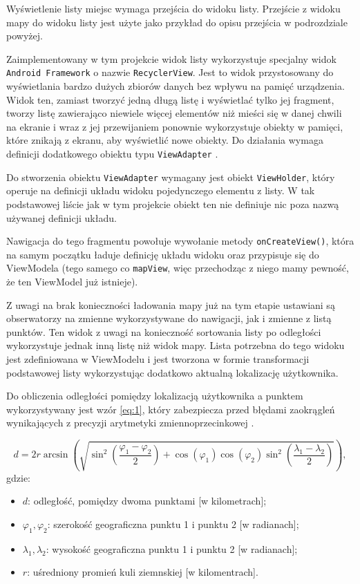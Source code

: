 \documentclass[polish,polish,a4paper,12pt]{article}
\begin{document}
	Wyświetlenie listy miejsc wymaga przejścia do widoku listy. Przejście z widoku mapy do widoku listy jest użyte jako przykład do opisu przejścia w podrozdziale powyżej.

	Zaimplementowany w tym projekcie widok listy wykorzystuje specjalny widok \texttt{Android Framework} o nazwie \texttt{RecyclerView}. Jest to widok przystosowany do wyświetlania bardzo dużych zbiorów danych bez wpływu na pamięć urządzenia. Widok ten, zamiast tworzyć jedną długą listę i wyświetlać tylko jej fragment, tworzy listę zawierająco niewiele więcej elementów niż mieści się w danej chwili na ekranie i wraz z jej przewijaniem ponownie wykorzystuje obiekty w pamięci, które znikają z ekranu, aby wyświetlić nowe obiekty. Do działania wymaga definicji dodatkowego obiektu typu \texttt{ViewAdapter} \cite{androidapi}.

	Do stworzenia obiektu \texttt{ViewAdapter} wymagany jest obiekt \texttt{ViewHolder}, który operuje na definicji układu widoku pojedynczego elementu z listy. W tak podstawowej liście jak w tym projekcie obiekt ten nie definiuje nic poza nazwą używanej definicji układu.

	Nawigacja do tego fragmentu powołuje wywołanie metody \texttt{onCreateView()}, która na samym początku ładuje definicję układu widoku oraz przypisuje się do ViewModela (tego samego co \texttt{mapView}, więc przechodząc z niego mamy pewność, że ten ViewModel już istnieje).

	Z uwagi na brak konieczności ładowania mapy już na tym etapie ustawiani są obserwatorzy na zmienne wykorzystywane do nawigacji, jak i zmienne z listą punktów. Ten widok z uwagi na konieczność sortowania listy po odległości wykorzystuje jednak inną listę niż widok mapy. Lista potrzebna do tego widoku jest zdefiniowana w ViewModelu i jest tworzona w formie transformacji podstawowej listy wykorzystując dodatkowo aktualną lokalizację użytkownika.

	Do obliczenia odległości pomiędzy lokalizacją użytkownika a punktem wykorzystywany jest wzór \ref{eq:1}, który zabezpiecza przed błędami zaokrągleń wynikających z precyzji arytmetyki zmiennoprzecinkowej \cite{haversineformulawiki}.

	\begin{equation}
d = 2r\arcsin(\sqrt{\sin^2(\frac{\varphi_1-\varphi_2}{2})+\cos(\varphi_1)\cos(\varphi_2)\sin^2(\frac{\lambda_1-\lambda_2}{2})}),\label{eq:1}
	\end{equation}
	gdzie:
	\begin{itemize}
		\item $ d $: odległość, pomiędzy dwoma punktami [w kilometrach];
		\item $ \varphi_1, \varphi_2 $: szerokość geograficzna punktu 1 i punktu 2 [w radianach];
		\item $ \lambda_1, \lambda_2 $: wysokość geograficzna punktu 1 i punktu 2 [w radianach];
		\item $ r $: uśredniony promień kuli ziemnskiej [w kilomentrach].
	\end{itemize}
\end{document}
